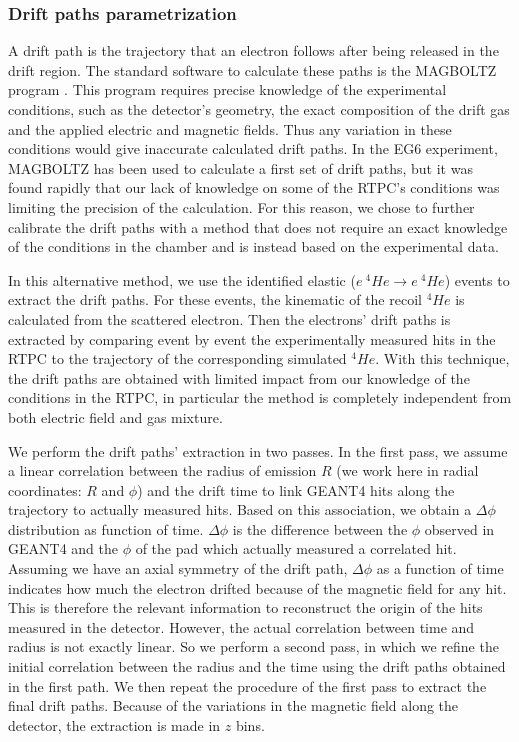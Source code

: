 \subsubsection{Drift paths parametrization}

A drift path is the trajectory that an electron follows after being 
released in the drift region. The standard software to calculate these paths is 
the MAGBOLTZ program \cite{MAGBOLTZ}. This program requires precise knowledge 
of the experimental conditions, such as the detector's geometry, the exact 
composition of the drift gas and the applied electric and magnetic fields. Thus 
any variation in these conditions would give inaccurate calculated drift paths.  
In the EG6 experiment, MAGBOLTZ has been used to calculate a first set of drift 
paths, but it was found rapidly that our lack of knowledge on some of the RTPC's 
conditions was limiting the precision of the calculation. For this reason, we 
chose to further calibrate the drift paths with a method 
that does not require an exact knowledge of the conditions in the chamber 
and is instead based on the experimental data.  

In this alternative method, we use the identified elastic ($e ~ ^{4}He 
\rightarrow e ~ ^{4}He$) events to extract the drift paths. For these events, 
the kinematic of the recoil $^{4}He$ is calculated from the scattered 
electron. Then the electrons' drift paths is extracted by comparing event
by event the experimentally measured hits in the RTPC to the 
trajectory of the corresponding simulated $^{4}He$. With this technique, the 
drift paths are obtained with limited impact from our knowledge of the 
conditions in the RTPC, in particular the method is completely independent 
from both electric field and gas mixture. 

We perform the drift paths' extraction in two passes. 
In the first pass, we assume a linear correlation between the 
radius of emission $R$ (we work here in radial coordinates: $R$ and $\phi$) and the 
drift time to link GEANT4 hits along the trajectory to actually measured 
hits. Based on this association, we obtain a $\Delta \phi$ distribution 
as function of time. $\Delta \phi$ is the 
difference between the $\phi$ observed in GEANT4 and the $\phi$ of the pad 
which actually measured a correlated hit. Assuming we have an axial 
symmetry of the drift path, $\Delta \phi$ as a function of time indicates 
how much the electron drifted because of the magnetic field for any hit. 
This is therefore the relevant information to reconstruct the origin
of the hits measured in the detector.
However, the actual correlation between time and radius is not exactly
linear. So we perform a second pass, in which we refine the initial 
correlation between the radius and the time using the drift paths obtained 
in the first path. We then repeat the procedure of the first pass to extract 
the final drift paths. Because of the variations in the magnetic 
field along the detector, the extraction is made in $z$ bins. 

